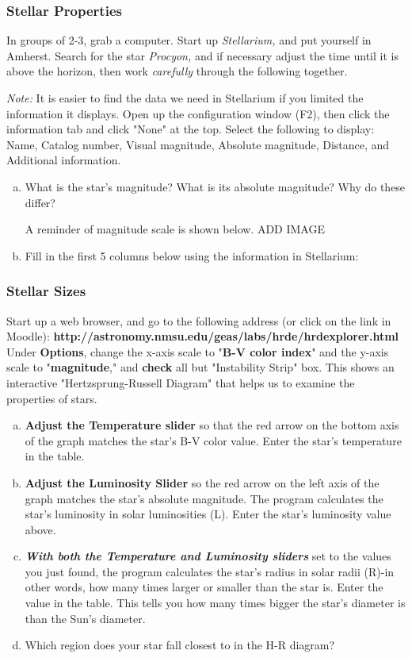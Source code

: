 \documentclass[main.tex]{subfiles}
\begin{document}
\subsubsection{Stellar Properties}
In groups of 2-3, grab a computer. Start up \textit{Stellarium,} and put yourself in Amherst. Search for the star \textit{Procyon,} and if necessary adjust the time until it is above the horizon, then work \textit{carefully} through the following together. 

\textit{Note:} It is easier to find the data we need in Stellarium if you limited the information it displays. Open up the configuration window (F2), then click the information tab and click "None" at the top. Select the following to display: Name, Catalog number, Visual magnitude, Absolute magnitude, Distance, and Additional information.
\begin{enumerate} [a.]
    \item What is the star's magnitude? What is its absolute magnitude? Why do these differ? 
    
    A reminder of magnitude scale is shown below.
    ADD IMAGE
    \item Fill in the first 5 columns below using the information in Stellarium:
\end{enumerate}

\subsubsection{Stellar Sizes}
Start up a web browser, and go to the following address (or click on the link in Moodle): \textbf{http://astronomy.nmsu.edu/geas/labs/hrde/hrd\textunderscore explorer.html} Under \textbf{Options}, change the x-axis scale to "\textbf{B-V color index}" and the y-axis scale to "\textbf{magnitude}," and \textbf{check} all but "Instability Strip" box. This shows an interactive "Hertzsprung-Russell Diagram" that helps us to examine the properties of stars.
\begin{enumerate} [a.]
    \item \textbf{Adjust the Temperature slider} so that the red arrow on the bottom axis of the graph matches the star's B-V color value. Enter the star's temperature in the table.
    \item \textbf{Adjust the Luminosity Slider} so the red arrow on the left axis of the graph matches the star's absolute magnitude. The program calculates the star's luminosity in solar luminosities (L). Enter the star's luminosity value above. 
    \item \textbf{\textit{With both the Temperature and Luminosity sliders}} set to the values you just found, the program calculates the star's radius in solar radii (R)-in other words, how many times larger or smaller than the star is. Enter the value in the table. This tells you how many times bigger the star's diameter is than the Sun's diameter. 
    \item Which region does your star fall closest to in the H-R diagram?
\end{enumerate}
\end{document}
